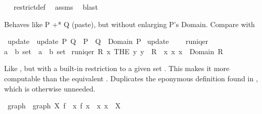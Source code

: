 \begin{isabellebody}
\isadelimproof
\ %
\endisadelimproof
%
\isatagproof
{}\isamarkupfalse%
\ restrict{\isacharunderscore}def\ \isamarkupfalse%
\ assms\ \isamarkupfalse%
\ blast%
\endisatagproof
{\isafoldproof}%
%
\isadelimproof
%
\endisadelimproof
%
\begin{isamarkuptext}%
Behaves like P +* Q (paste), but without enlarging P's Domain. Compare with %
\end{isamarkuptext}%
\isamarkuptrue%
\isamarkupfalse%
\ update\ \ {\isachardoublequoteopen}update\ P\ Q\ {\isacharequal}\ P\ {\isacharplus}{\isacharasterisk}\ {\isacharparenleft}Q\ {\isacharbar}{\isacharbar}\ {\isacharparenleft}Domain\ P{\isacharparenright}{\isacharparenright}{\isachardoublequoteclose}\isanewline
{}\isamarkupfalse%
\ update\ {\isacharparenleft}\ {\isachardoublequoteopen}{\isacharplus}{\isacharcircum}{\isachardoublequoteclose}\ {}{}{\isacharparenright}\isanewline
\isanewline
{}\isamarkupfalse%
\ runiqer\ \isanewline
{\isacharcolon}{\isacharcolon}{\isachardoublequoteopen}{\isacharparenleft}{\isacharprime}a\ {\isasymtimes}\ {\isacharprime}b{\isacharparenright}\ set\ {\isacharequal}{\isachargreater}\ {\isacharparenleft}{\isacharprime}a\ {\isasymtimes}\ {\isacharprime}b{\isacharparenright}\ set{\isachardoublequoteclose}\isanewline
\isanewline
{}\ {\isachardoublequoteopen}runiqer\ R{\isacharequal}{\isacharbraceleft}\ {\isacharparenleft}x{\isacharcomma}\ THE\ y{\isachardot}\ y\ {\isasymin}\ R\ {\isacharbackquote}{\isacharbackquote}\ {\isacharbraceleft}x{\isacharbraceright}{\isacharparenright}{\isacharbar}\ x{\isachardot}\ x\ {\isasymin}\ Domain\ R\ {\isacharbraceright}{\isachardoublequoteclose}%
\begin{isamarkuptext}%
Like , but with a built-in restriction to a given set .
This makes it more computable than the equivalent . 
Duplicates the eponymous definition found in , which is otherwise unneeded.%
\end{isamarkuptext}%
\isamarkuptrue%
\isamarkupfalse%
\ graph\ \ {\isachardoublequoteopen}graph\ X\ f\ {\isacharequal}\ {\isacharbraceleft}{\isacharparenleft}x{\isacharcomma}\ f\ x{\isacharparenright}\ {\isacharbar}\ x{\isachardot}\ x\ {\isasymin}\ X{\isacharbraceright}{\isachardoublequoteclose}\ \isanewline

\end{isabellebody}
